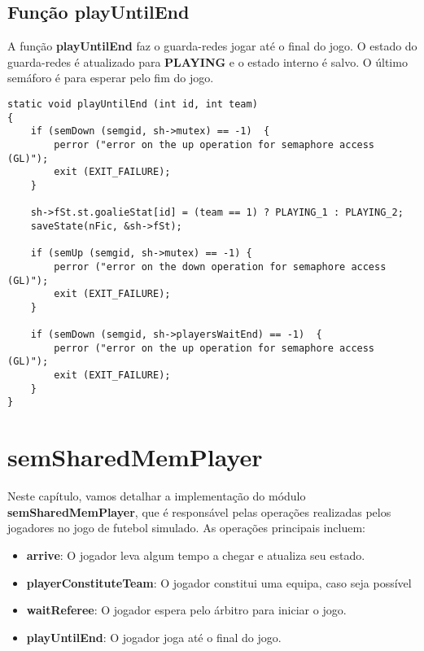 \documentclass[code,math]{relatorio-deti}
\begin{document}
\section{Função \textbf{playUntilEnd}}

A função \textbf{playUntilEnd} faz o guarda-redes jogar até o final do jogo. O estado do guarda-redes é atualizado para \textbf{PLAYING} e o estado interno é salvo. O último semáforo é para esperar pelo fim do jogo.

\begin{verbatim}
static void playUntilEnd (int id, int team)
{
    if (semDown (semgid, sh->mutex) == -1)  {                                                     
        perror ("error on the up operation for semaphore access (GL)");
        exit (EXIT_FAILURE);
    }

    sh->fSt.st.goalieStat[id] = (team == 1) ? PLAYING_1 : PLAYING_2;
    saveState(nFic, &sh->fSt);

    if (semUp (semgid, sh->mutex) == -1) {                                                         
        perror ("error on the down operation for semaphore access (GL)");
        exit (EXIT_FAILURE);
    }

    if (semDown (semgid, sh->playersWaitEnd) == -1)  {
        perror ("error on the up operation for semaphore access (GL)");
        exit (EXIT_FAILURE);
    }
}
\end{verbatim}

\chapter{semSharedMemPlayer}

Neste capítulo, vamos detalhar a implementação do módulo \textbf{semSharedMemPlayer}, que é responsável pelas operações realizadas pelos jogadores no jogo de futebol simulado. As operações principais incluem:

\begin{itemize}
    \item \textbf{arrive}: O jogador leva algum tempo a chegar e atualiza seu estado.
    \item \textbf{playerConstituteTeam}: O jogador constitui uma equipa, caso seja possível
    \item \textbf{waitReferee}: O jogador espera pelo árbitro para iniciar o jogo.
    \item \textbf{playUntilEnd}: O jogador joga até o final do jogo.
\end{itemize}
\end{document}
